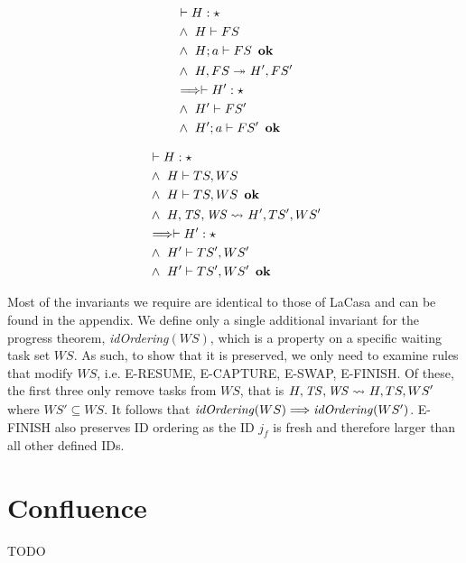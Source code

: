 \begin{theorem}
    \begin{alignat}{3}
    & \vdash H : \star\\
    &\wedge\ H \vdash FS\\
    &\wedge\ H; a \vdash FS\ \bn{ok}\\
    &\wedge\ \reducstack{}*[H']{}[FS']*\\
    &\Longrightarrow \vdash H' : \star\\
    &\wedge\ H' \vdash FS'\\
    &\wedge\ H'; a \vdash FS'\ \bn{ok}
    \end{alignat}
\end{theorem}

\begin{theorem}
    \begin{alignat}{3}
    & \vdash H : \star \label{pres-ts-prem-hstar}\\
    &\wedge\  H \vdash TS, WS \label{pres-ts-prem-tsws}\\
    &\wedge\  H \vdash TS, WS\ \bn{ok} \label{pres-ts-prem-tswsok}\\
    &\wedge\  \reductasks{}*[H']{}[TS', WS']* \label{pres-ts-prem-reduc}\\
    &\Longrightarrow \vdash H' : \star \label{pres-ts-concl-hstar}\\
    &\wedge\  H' \vdash TS', WS' \label{pres-ts-concl-tsws}\\
    &\wedge\  H' \vdash TS', WS'\ \bn{ok} \label{pres-ts-concl-tswsok}
    \end{alignat}
\end{theorem}

Most of the invariants we require are identical to those of LaCasa and can be found in the appendix. We define only a single additional invariant for the progress theorem, \textit{idOrdering}$(WS)$, which is a property on a specific waiting task set $WS$. As such, to show that it is preserved, we only need to examine rules that modify $WS$, i.e. E-RESUME, E-CAPTURE, E-SWAP, E-FINISH. Of these, the first three only remove tasks from $WS$, that is $\reductasks{}*{}[TS, WS']*$ where $WS' \subseteq WS$. It follows that $\mathop{\mathit{idOrdering}}(WS) \Longrightarrow \mathop{\mathit{idOrdering}}(WS')$. E-FINISH also preserves ID ordering as the ID $j_f$ is fresh and therefore larger than all other defined IDs. 

\section{Confluence}
TODO
